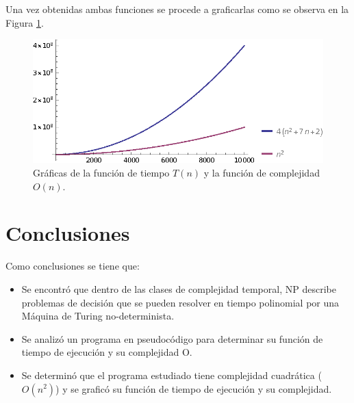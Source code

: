 Una vez obtenidas ambas funciones se procede a graficarlas como se observa en la Figura \ref{fig:OnTn}.

\begin{figure}[H]
\centering
\includegraphics[width=\textwidth]{imgs/Labo5/plot.eps}
\caption{Gráficas de la función de tiempo $T(n)$ y la función de complejidad $O(n)$.}
\label{fig:OnTn}
\end{figure}

\section{Conclusiones}


Como conclusiones se tiene que:

\begin{itemize}
\item Se encontró que dentro de las clases de complejidad temporal, NP describe problemas de decisión que se pueden resolver en tiempo polinomial por una Máquina de Turing no-determinista.
\item Se analizó un programa en pseudocódigo para determinar su función de tiempo de ejecución y su complejidad O.
\item Se determinó que el programa estudiado tiene complejidad cuadrática ($O(n^2)$) y se graficó su función de tiempo de ejecución y su complejidad.
\end{itemize}


